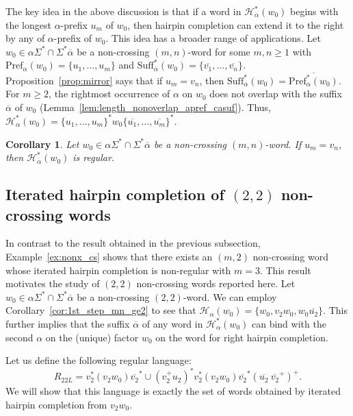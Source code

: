 \documentclass{article}
\theoremstyle{plain}
\newtheorem{corollary}{Corollary}
\theoremstyle{remark}
\newcommand{\HC}{\ensuremath{\mathcal{H}}}
\newcommand{\Pref}{\ensuremath{\mathrm{Pref}}}
\newcommand{\Suff}{\ensuremath{\mathrm{Suff}}}
\newcommand{\calpha}{\ensuremath{\overline{\alpha}}}
\begin{document}
The key idea in the above discussion is that if a word in $\HC_\alpha^*(w_0)$ begins with the longest $\alpha$-prefix $u_m$ of $w_0$, then hairpin completion can extend it to the right by any of $\alpha$-prefix of $w_0$. 
This idea has a broader range of applications. 
Let $w_0 \in \alpha \Sigma^* \cap \Sigma^* \calpha$ be a non-crossing $(m, n)$-word for some $m, n \ge 1$ with $\Pref_\alpha(w_0) = \{u_1, \ldots, u_m\}$ and $\Suff_{\calpha}^*(w_0) = \{\overline{v_1}, \ldots, \overline{v_n}\}$. 
Proposition~\ref{prop:mirror} says that if $u_m = v_n$, then $\Suff_{\calpha}^*(w_0) = \overline{\Pref_\alpha^*(w_0)}$. 
For $m \ge 2$, the rightmost occurrence of $\alpha$ on $w_0$ does not overlap with the suffix $\calpha$ of $w_0$ (Lemma~\ref{lem:length_nonoverlap_apref_casuf}). 
Thus, $\HC_\alpha^*(w_0) = \{u_1, \ldots, u_m\}^* w_0 \{\overline{u_1}, \ldots, \overline{u_m}\}^*$. 

\begin{corollary}\label{cor:mn_palindrome-like_regular}
	Let $w_0 \in \alpha \Sigma^* \cap \Sigma^* \calpha$ be a non-crossing $(m, n)$-word. 
	If $u_m = v_n$, then $\HC_\alpha^*(w_0)$ is regular. 
\end{corollary}

\subsection{Iterated hairpin completion of $(2, 2)$ non-crossing words}

In contrast to the result obtained in the previous subsection, Example~\ref{ex:nonx_cs} shows that there exists an $(m, 2)$ non-crossing word whose iterated hairpin completion is non-regular with $m = 3$. 
This result motivates the study of $(2, 2)$ non-crossing words reported here. 
Let $w_0 \in \alpha \Sigma^* \cap \Sigma^* \calpha$ be a non-crossing $(2, 2)$-word. 
We can employ Corollary~\ref{cor:1st_step_mn_ge2} to see that $\HC_\alpha(w_0) = \{w_0, v_2 w_0, w_0 \overline{u_2}\}$. 
This further implies that the suffix $\calpha$ of any word in $\HC_\alpha^*(w_0)$ can bind with the second $\alpha$ on the (unique) factor $w_0$ on the word for right hairpin completion. 

Let us define the following regular language: 
\[
	R_{22L} = v_2^* (v_2 w_0) \overline{v_2}^* \cup (v_2^+ u_2)^* v_2^* (v_2 w_0) \overline{v_2}^* (\overline{u_2} \ \overline{v_2}^+)^+.
\]
We will show that this language is exactly the set of words obtained by iterated hairpin completion from $v_2 w_0$. 
\end{document}
